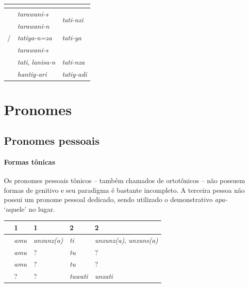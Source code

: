 \begin{center}
	\begin{tabular}[c]{lll}
		\toprule
		                      & \Sg{}\emph{}                 & \Pl{}\emph{}                       \\
		\midrule
		\Nom{} \Com{}         & \emph{tarawani-s}            & \multirow{2}{4em}{\emph{tati-nzi}} \\
		\Acu{} \Com{}         & \emph{tarawani-n}            &                                    \\
		\Nom{}/\Acu{} \Neut{} & \emph{tatiya-n=za}           & \emph{tati-ya}                     \\
		\Gen{}                & \emph{tarawani-s}            &                                    \\
		\Dat{}                & \emph{tati}, \emph{lanisa-n} & \emph{tati-nza}                    \\
		\Abl{}                & \emph{hantiy-ari}            & \emph{tatiy-adi}                   \\
		\bottomrule
	\end{tabular}
\end{center}


\section{Pronomes}

\subsection{Pronomes pessoais}



\paragraph{Formas tônicas}
Os pronomes pessoais tônicos -- também chamados de
ortotônicos -- não possuem formas de genitivo e seu paradigma é bastante
incompleto. A terceira pessoa não possui um pronome pessoal dedicado, sendo
utilizado o demonstrativo \emph{apa-} `aquele' no lugar.


\begin{center}
	\begin{tabular}[c]{lll|ll}
		\toprule
		       & 1\Sg{}\emph{} & 1\Pl{}\emph{}      & 2\Sg{}\emph{} & 2\Pl{}\emph{}                          \\
		\midrule
		\Nom{} & \emph{amu}    & \emph{anzunz{(a)}} & \emph{ti}     & \emph{unzunz{(a)}}, \emph{unzuns{(a)}} \\
		\Acu{} & \emph{amu}    & {?}\emph{}         & \emph{tu}     & {?}\emph{}                             \\
		\Dat{} & \emph{amu}    & {?}\emph{}         & \emph{tu}     & {?}\emph{}                             \\
		\Abl{} & {?}\emph{}    & {?}\emph{}         & \emph{tuwati} & \emph{unzati}                          \\
		\bottomrule
	\end{tabular}
\end{center}

